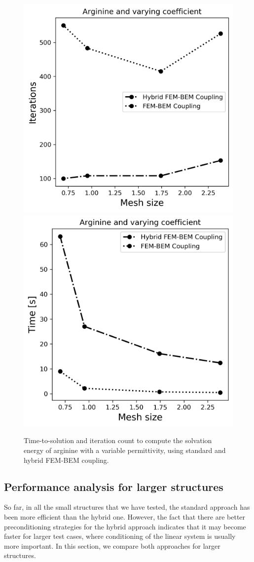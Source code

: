 \begin{figure}
\centering
\includegraphics[width=0.45\linewidth]{Arginine_varying_coeff_iter.png}
\includegraphics[width=0.45\linewidth]{Arginine_varying_coeff_time.png}
\caption{Time-to-solution and iteration count to compute the solvation energy of arginine with a variable permittivity, using standard and hybrid FEM-BEM coupling. %
}
\label{fig:arg_variable}
\end{figure}


\subsection*{\sffamily \large Performance analysis for larger structures}

So far, in all the small structures that we have tested, the standard approach has been more efficient than the hybrid one.
However, the fact that there are better preconditioning strategies for the hybrid approach indicates that it may become faster for larger test cases, where conditioning of the linear system is usually more important. 
In this section, we compare both approaches for larger structures.
